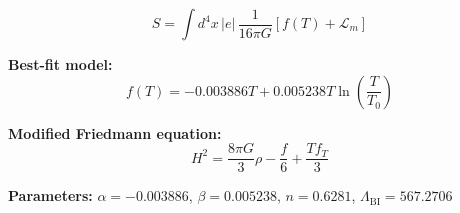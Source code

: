 
\begin{equation}
  S = \int d^4x \, |e| \, \frac{1}{16\pi G} \left[ f(T) + \mathcal{L}_m \right]
\end{equation}

\textbf{Best-fit model:}
\begin{equation}
  f(T) = -0.003886 T + 0.005238 T \ln\!\left(\frac{T}{T_0}\right)
\end{equation}

\textbf{Modified Friedmann equation:}
\begin{equation}
  H^2 = \frac{8\pi G}{3} \rho - \frac{f}{6} + \frac{T f_T}{3}
\end{equation}

\textbf{Parameters:}
$\alpha = -0.003886$, \quad
$\beta = 0.005238$, \quad
$n = 0.6281$, \quad
$\Lambda_{\text{BI}} = 567.2706$
